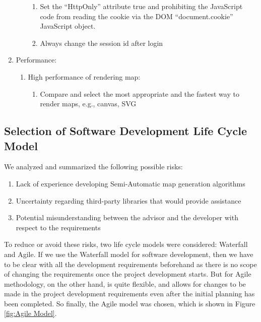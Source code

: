 \begin{enumerate}
\begin{enumerate}
\begin{enumerate}
      \item Set the ``HttpOnly'' attribute true and prohibiting the JavaScript code from reading the cookie via the DOM ``document.cookie'' JavaScript object.
      \item Always change the session id after login
    \end{enumerate}
  \end{enumerate}
  \item Performance:
  \begin{enumerate}
    \item High performance of rendering map:
    \begin{enumerate}
      \item Compare and select the most appropriate and the fastest way to render maps, e.g., canvas, SVG
    \end{enumerate}
  \end{enumerate}
\end{enumerate}

\subsection{Selection of Software Development Life Cycle Model}
\label{sec:Requirements>SDLC}
We analyzed and summarized the following possible risks:
\begin{enumerate}
  \item Lack of experience developing Semi-Automatic map generation algorithms
  \item Uncertainty regarding third-party libraries that would provide assistance
  \item Potential misunderstanding between the advisor and the developer with respect to the requirements
\end{enumerate}

To reduce or avoid these risks, two life cycle models were considered: Waterfall and Agile. If we use the Waterfall model for software development, then we have to be clear with all the development requirements beforehand as there is no scope of changing the requirements once the project development starts. But for Agile methodology, on the other hand, is quite flexible, and allows for changes to be made in the project development requirements even after the initial planning has been completed. So finally, the Agile model was chosen, which is shown in Figure \ref{fig:Agile Model}.

